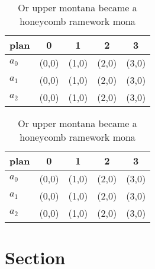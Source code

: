 \documentclass[a4paper]{article}
\begin{document}
\begin{table}
\begin{adjustbox}{width=0.5\columnwidth}
\begin{tabular}{|l|l|l|l|l|}
\hline
\textbf{plan} & \multicolumn{1}{c|}{\textbf{0}} & \multicolumn{1}{c|}{\textbf{1}} & \multicolumn{1}{c|}{\textbf{2}} & \multicolumn{1}{c|}{\textbf{3}} \\ \hline
\textbf{$a_0$}  & (0,0) & (1,0) & (2,0) & (3,0) \\ \hline
\textbf{$a_1$}  & (0,0) & (1,0) & (2,0) & (3,0) \\ \hline
\textbf{$a_2$}  & (0,0) & (1,0) & (2,0) & (3,0) \\ \hline
\end{tabular}
\end{adjustbox}
\caption{Or upper montana became a honeycomb ramework mona
}
\end{table}

\begin{table}
\begin{adjustbox}{width=0.5\columnwidth}
\begin{tabular}{|l|l|l|l|l|}
\hline
\textbf{plan} & \multicolumn{1}{c|}{\textbf{0}} & \multicolumn{1}{c|}{\textbf{1}} & \multicolumn{1}{c|}{\textbf{2}} & \multicolumn{1}{c|}{\textbf{3}} \\ \hline
\textbf{$a_0$}  & (0,0) & (1,0) & (2,0) & (3,0) \\ \hline
\textbf{$a_1$}  & (0,0) & (1,0) & (2,0) & (3,0) \\ \hline
\textbf{$a_2$}  & (0,0) & (1,0) & (2,0) & (3,0) \\ \hline
\end{tabular}
\end{adjustbox}
\caption{Or upper montana became a honeycomb ramework mona
}
\end{table}

\section{Section}
\end{document}
